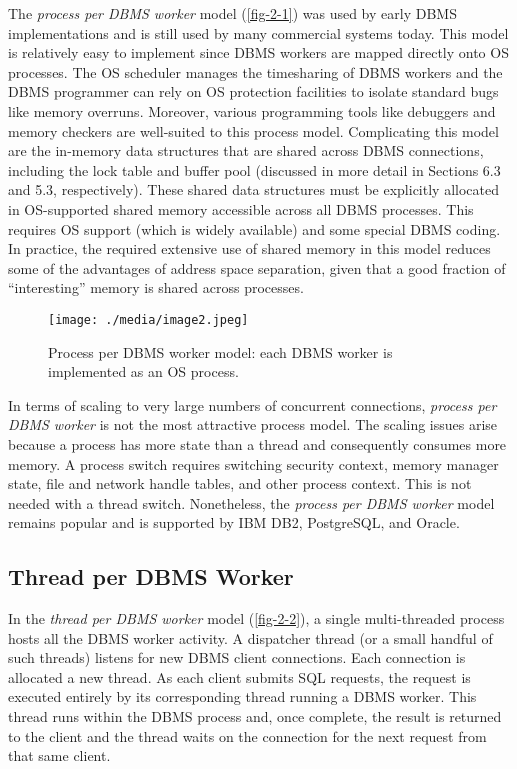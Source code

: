 \documentclass[b5paper,11pt,twoside,openright]{book}
\begin{document}
The \emph{process per DBMS worker} model (\autoref{fig-2-1}) was used by early
DBMS implementations and is still used by many commercial systems today.
This model is relatively easy to implement since DBMS workers are mapped
directly onto OS processes. The OS scheduler manages the timesharing of
DBMS workers and the DBMS programmer can rely on OS protection
facilities to isolate standard bugs like memory overruns. Moreover,
various programming tools like debuggers and memory checkers are
well-suited to this process model. Complicating this model are the
in-memory data structures that are shared across DBMS connections,
including the lock table and buffer pool (discussed in more detail in
Sections 6.3 and 5.3, respectively). These shared data structures must
be explicitly allocated in OS-supported shared memory accessible across
all DBMS processes. This requires OS support (which is widely available)
and some special DBMS coding. In practice, the required extensive use of shared memory in this model reduces some of
the advantages of address space separation, given that a good fraction
of ``interesting'' memory is shared across processes.

\begin{figure}
\centering
\texttt{[image: ./media/image2.jpeg]}

\caption{Process per DBMS worker model: each DBMS worker is implemented
as an OS process.\label{fig-2-1}}
\end{figure}

In terms of scaling to very large numbers of concurrent connections,
\emph{process per DBMS worker} is not the most attractive process model.
The scaling issues arise because a process has more state than a thread
and consequently consumes more memory. A process switch requires
switching security context, memory manager state, file and network
handle tables, and other process context. This is not needed with a
thread switch. Nonetheless, the \emph{process per DBMS worker} model
remains popular and is supported by IBM DB2, PostgreSQL, and Oracle.

\hypertarget{thread-per-dbms-worker}{%
\subsection{Thread per DBMS Worker}\label{thread-per-dbms-worker}}

In the \emph{thread per DBMS worker} model (\autoref{fig-2-2}), a single
multi-threaded process hosts all the DBMS worker activity. A dispatcher
thread (or a small handful of such threads) listens for new DBMS client
connections. Each connection is allocated a new thread. As each client
submits SQL requests, the request is executed entirely by its
corresponding thread running a DBMS worker. This thread runs within the
DBMS process and, once complete, the result is returned to the client
and the thread waits on the connection for the next request from that
same client.
\end{document}

